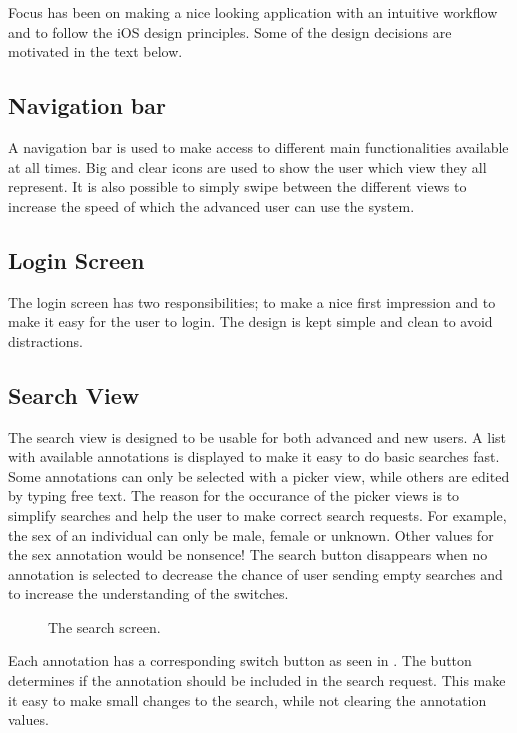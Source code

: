 Focus has been on making a nice looking application with an intuitive workflow and to follow the iOS design principles. Some of the design decisions are motivated in the text below.

\subsection{Navigation bar}
A navigation bar is used to make access to different main functionalities available at all times. Big and clear icons are used to show the user which view they all represent. It is also possible to simply swipe between the different views to increase the speed of which the advanced user can use the system.

\subsection{Login Screen}
The login screen has two responsibilities; to make a nice first impression and to make it easy for the user to login. The design is kept simple and clean to avoid distractions.

\subsection{Search View}
The search view is designed to be usable for both advanced and new users. A list with available annotations is displayed to make it easy to do basic searches fast. Some annotations can only be selected with a picker view, while others are edited by typing free text. The reason for the occurance of the picker views is to simplify searches and help the user to make correct search requests. For example, the sex of an individual can only be male, female or unknown. Other values for the sex annotation would be nonsence! The search button disappears when no annotation is selected to decrease the chance of user sending empty searches and to increase the understanding of the switches. 

\begin{figure}[ht]
\caption{The search screen.}
\label{fig:ios_search2}
\end{figure}
\FloatBarrier

Each annotation has a corresponding switch button as seen in . The button determines if the annotation should be included in the search request. This make it easy to make small changes to the search, while not clearing the annotation values.

